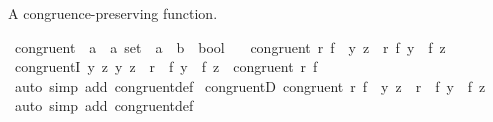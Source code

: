 \begin{isabellebody}
{\isafolddocument}%
%
\isadelimdocument
%
\endisadelimdocument
%
\begin{isamarkuptext}%
A congruence-preserving function.%
\end{isamarkuptext}\isamarkuptrue%
\isamarkupfalse%
\ congruent\ {\isacharcolon}{\kern0pt}{\isacharcolon}{\kern0pt}\ {\isachardoublequoteopen}{\isacharparenleft}{\kern0pt}{\isacharprime}{\kern0pt}a\ {\isasymtimes}\ {\isacharprime}{\kern0pt}a{\isacharparenright}{\kern0pt}\ set\ {\isasymRightarrow}\ {\isacharparenleft}{\kern0pt}{\isacharprime}{\kern0pt}a\ {\isasymRightarrow}\ {\isacharprime}{\kern0pt}b{\isacharparenright}{\kern0pt}\ {\isasymRightarrow}\ bool{\isachardoublequoteclose}\isanewline
\ \ \ {\isachardoublequoteopen}congruent\ r\ f\ {\isasymlongleftrightarrow}\ {\isacharparenleft}{\kern0pt}{\isasymforall}{\isacharparenleft}{\kern0pt}y{\isacharcomma}{\kern0pt}\ z{\isacharparenright}{\kern0pt}\ {\isasymin}\ r{\isachardot}{\kern0pt}\ f\ y\ {\isacharequal}{\kern0pt}\ f\ z{\isacharparenright}{\kern0pt}{\isachardoublequoteclose}\isanewline
\isanewline
{}\isamarkupfalse%
\ congruentI{\isacharcolon}{\kern0pt}\ {\isachardoublequoteopen}{\isacharparenleft}{\kern0pt}{\isasymAnd}y\ z{\isachardot}{\kern0pt}\ {\isacharparenleft}{\kern0pt}y{\isacharcomma}{\kern0pt}\ z{\isacharparenright}{\kern0pt}\ {\isasymin}\ r\ {\isasymLongrightarrow}\ f\ y\ {\isacharequal}{\kern0pt}\ f\ z{\isacharparenright}{\kern0pt}\ {\isasymLongrightarrow}\ congruent\ r\ f{\isachardoublequoteclose}\isanewline
%
\isadelimproof
\ \ %
\endisadelimproof
%
\isatagproof
{}\isamarkupfalse%
\ {\isacharparenleft}{\kern0pt}auto\ simp\ add{\isacharcolon}{\kern0pt}\ congruent{\isacharunderscore}{\kern0pt}def{\isacharparenright}{\kern0pt}%
\endisatagproof
{\isafoldproof}%
%
\isadelimproof
\isanewline
%
\endisadelimproof
\isanewline
{}\isamarkupfalse%
\ congruentD{\isacharcolon}{\kern0pt}\ {\isachardoublequoteopen}congruent\ r\ f\ {\isasymLongrightarrow}\ {\isacharparenleft}{\kern0pt}y{\isacharcomma}{\kern0pt}\ z{\isacharparenright}{\kern0pt}\ {\isasymin}\ r\ {\isasymLongrightarrow}\ f\ y\ {\isacharequal}{\kern0pt}\ f\ z{\isachardoublequoteclose}\isanewline
%
\isadelimproof
\ \ %
\endisadelimproof
%
\isatagproof
{}\isamarkupfalse%
\ {\isacharparenleft}{\kern0pt}auto\ simp\ add{\isacharcolon}{\kern0pt}\ congruent{\isacharunderscore}{\kern0pt}def{\isacharparenright}{\kern0pt}%
\endisatagproof
{\isafoldproof}%
%
\isadelimproof
\isanewline
%
\endisadelimproof
\isanewline
{}\isamarkupfalse%

\end{isabellebody}
